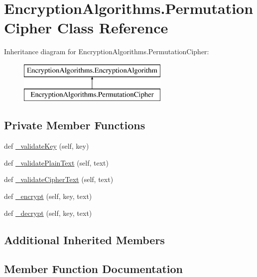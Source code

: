\hypertarget{classEncryptionAlgorithms_1_1PermutationCipher}{}\section{Encryption\+Algorithms.\+Permutation\+Cipher Class Reference}
\label{classEncryptionAlgorithms_1_1PermutationCipher}
Inheritance diagram for Encryption\+Algorithms.\+Permutation\+Cipher\+:\begin{figure}[H]
\begin{center}
\leavevmode
\includegraphics[height=2.000000cm]{classEncryptionAlgorithms_1_1PermutationCipher}
\end{center}
\end{figure}
\subsection*{Private Member Functions}
\begin{DoxyCompactItemize}
\item 
def \mbox{\hyperlink{classEncryptionAlgorithms_1_1PermutationCipher_acb25f849a94ae3e4e09c89538161d5df}{\+\_\+validate\+Key}} (self, key)
\item 
def \mbox{\hyperlink{classEncryptionAlgorithms_1_1PermutationCipher_a945832a0811988d4c15ef05923c26b6c}{\+\_\+validate\+Plain\+Text}} (self, text)
\item 
def \mbox{\hyperlink{classEncryptionAlgorithms_1_1PermutationCipher_a223a8ae8f5541420088a0b50a738c8ea}{\+\_\+validate\+Cipher\+Text}} (self, text)
\item 
def \mbox{\hyperlink{classEncryptionAlgorithms_1_1PermutationCipher_a81b8d8bcde87b89858849a48c9228351}{\+\_\+encrypt}} (self, key, text)
\item 
def \mbox{\hyperlink{classEncryptionAlgorithms_1_1PermutationCipher_a9cc459cdb613ceea51389446036c4814}{\+\_\+decrypt}} (self, key, text)
\end{DoxyCompactItemize}
\subsection*{Additional Inherited Members}


\subsection{Member Function Documentation}
\mbox{\label{classEncryptionAlgorithms_1_1PermutationCipher_a9cc459cdb613ceea51389446036c4814}} 
